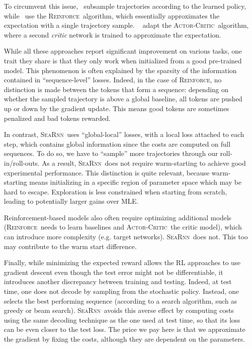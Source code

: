 \documentclass{article}
\newcommand{\SEARNN}{\textsc{SeaRnn}}
\newcommand{\REINFORCE}{\textsc{Reinforce}}
\newcommand{\ACTORCRITIC}{\textsc{Actor-Critic}}
\begin{document}
	To circumvent this issue,~\citet{Shen2016b} subsample trajectories according to the learned policy, while~\citet{Ranzato2016b, Rennie2016} use the \REINFORCE\ algorithm, which essentially approximates the expectation with a single trajectory sample.
	~\citet{Bahdanau2016} adapt the \ACTORCRITIC\ algorithm, where a second \textit{critic} network is trained to approximate the expectation.

	While all these approaches report significant improvement on various tasks, one trait they share is that they only work when initialized from a good pre-trained model.
	This phenomenon is often explained by the sparsity of the information contained in ``sequence-level'' losses.
	Indeed, in the case of \REINFORCE, no distinction is made between the tokens that form a sequence: depending on whether the sampled trajectory is above a global baseline, all tokens are pushed up or down by the gradient update.
	This means good tokens are sometimes penalized and bad tokens rewarded.

	In contrast, \SEARNN\ uses ``global-local'' losses, with a local loss attached to each step, which contains global information since the costs are computed on full sequences.
	To do so, we have to ``sample'' more trajectories through our roll-in/roll-outs.
	As a result, \SEARNN\ does not require warm-starting to achieve good experimental performance.
	This distinction is quite relevant, because warm-starting means initializing in a specific region of parameter space which may be hard to escape.
	Exploration is less constrained when starting from scratch, leading to potentially larger gains over MLE.

	Reinforcement-based models also often require optimizing additional models (\REINFORCE\ needs to learn baselines and \ACTORCRITIC\ the critic model), which can introduce more complexity (e.g. target networks). \SEARNN\ does not.
	This too may contribute to the warm start difference.

	Finally, while minimizing the expected reward allows the RL approaches to use gradient descent even though the test error might not be differentiable, it introduces another discrepancy between training and testing.
	Indeed, at test time, one does not decode by sampling from the stochastic policy.
	Instead, one selects the best performing sequence (according to a search algorithm, such as greedy or beam search).
	\SEARNN\ avoids this averse effect by computing costs using the same decoding technique as the one used at test time, so that its loss can be even closer to the test loss.
	The price we pay here is that we approximate the gradient by fixing the costs, although they are dependent on the parameters.
\end{document}
